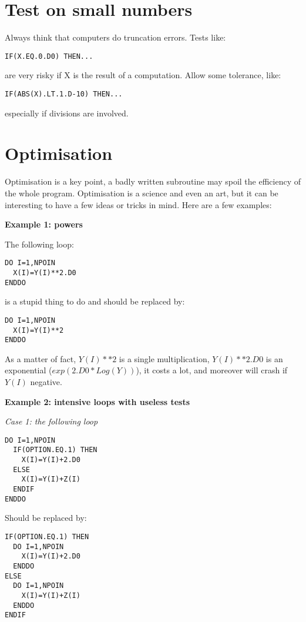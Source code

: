 \section{Test on small numbers}

Always think that computers do truncation errors. Tests like:
\begin{lstlisting}
IF(X.EQ.0.D0) THEN...
\end{lstlisting}
are very risky if X is the result of a computation.
Allow some tolerance, like:
\begin{lstlisting}
IF(ABS(X).LT.1.D-10) THEN...
\end{lstlisting}
especially if divisions are involved.

\section{Optimisation}

Optimisation is a key point, a badly written subroutine may spoil the
efficiency of the whole program. Optimisation is a science and even an art, but
it can be interesting to have a few ideas or tricks in mind. Here are a few
examples:

\textbf{Example 1: powers}

The following loop:
\begin{lstlisting}
DO I=1,NPOIN
  X(I)=Y(I)**2.D0
ENDDO
\end{lstlisting}

is a stupid thing to do and should be replaced by:

\begin{lstlisting}
DO I=1,NPOIN
  X(I)=Y(I)**2
ENDDO
\end{lstlisting}

As a matter of fact, $Y(I)**2$ is a single multiplication, $Y(I)**2.D0$ is an
exponential ($exp(2.D0*Log (Y))$), it costs a lot, and moreover will crash if
$Y(I)$ negative.

\textbf{Example 2: intensive loops with useless tests}

\textit{Case 1: the following loop}

\begin{lstlisting}
DO I=1,NPOIN
  IF(OPTION.EQ.1) THEN
    X(I)=Y(I)+2.D0
  ELSE
    X(I)=Y(I)+Z(I)
  ENDIF
ENDDO
\end{lstlisting}

Should be replaced by:

\begin{lstlisting}
IF(OPTION.EQ.1) THEN
  DO I=1,NPOIN
    X(I)=Y(I)+2.D0
  ENDDO
ELSE
  DO I=1,NPOIN
    X(I)=Y(I)+Z(I)
  ENDDO
ENDIF
\end{lstlisting}

